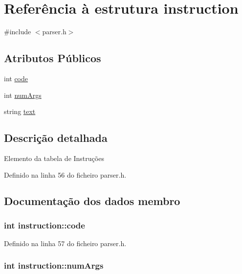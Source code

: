 \hypertarget{structinstruction}{\section{Referência à estrutura instruction}
\label{structinstruction}
}


{\ttfamily \#include $<$parser.\-h$>$}

\subsection*{Atributos Públicos}
\begin{DoxyCompactItemize}
\item 
int \hyperlink{structinstruction_a20ba1219d473773f35384214c08f717c}{code}
\item 
int \hyperlink{structinstruction_abb5712c98f149b197b5c58b2dac15a03}{num\-Args}
\item 
string \hyperlink{structinstruction_af31af10ecfe7d2fdf154616d0aede8ea}{text}
\end{DoxyCompactItemize}


\subsection{Descrição detalhada}
Elemento da tabela de Instruções 

Definido na linha 56 do ficheiro parser.\-h.



\subsection{Documentação dos dados membro}
\hypertarget{structinstruction_a20ba1219d473773f35384214c08f717c}{
\subsubsection[{code}]{\setlength{\rightskip}{0pt plus 5cm}int instruction\-::code}}\label{structinstruction_a20ba1219d473773f35384214c08f717c}


Definido na linha 57 do ficheiro parser.\-h.

\hypertarget{structinstruction_abb5712c98f149b197b5c58b2dac15a03}{
\subsubsection[{num\-Args}]{\setlength{\rightskip}{0pt plus 5cm}int instruction\-::num\-Args}}\label{structinstruction_abb5712c98f149b197b5c58b2dac15a03}



